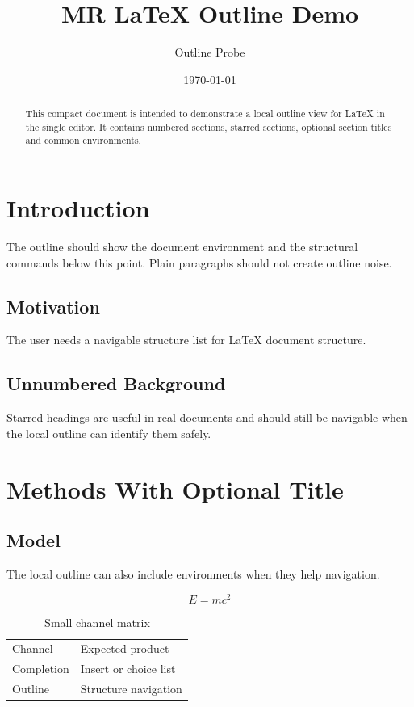 \documentclass{article}
\title{MR LaTeX Outline Demo}
\author{Outline Probe}
\date{\today}
\begin{document}
\maketitle

\begin{abstract}
This compact document is intended to demonstrate a local outline view for
LaTeX in the single editor.  It contains numbered sections, starred sections,
optional section titles and common environments.
\end{abstract}

\section{Introduction}

The outline should show the document environment and the structural commands
below this point.  Plain paragraphs should not create outline noise.

\subsection{Motivation}

The user needs a navigable structure list for LaTeX document structure.

\subsection*{Unnumbered Background}

Starred headings are useful in real documents and should still be navigable
when the local outline can identify them safely.

\section[Short Methods]{Methods With Optional Title}

\subsection{Model}

The local outline can also include environments when they help navigation.

\begin{equation}
  E = mc^2
\end{equation}

\begin{table}
  \centering
  \begin{tabular}{ll}
    Channel & Expected product \\
    Completion & Insert or choice list \\
    Outline & Structure navigation \\
  \end{tabular}
  \caption{Small channel matrix}
\end{table}
\end{document}
